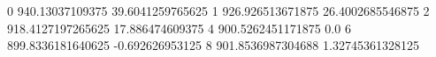 0 940.13037109375 39.6041259765625
1 926.926513671875 26.4002685546875
2 918.4127197265625 17.886474609375
4 900.5262451171875 0.0
6 899.8336181640625 -0.692626953125
8 901.8536987304688 1.32745361328125
